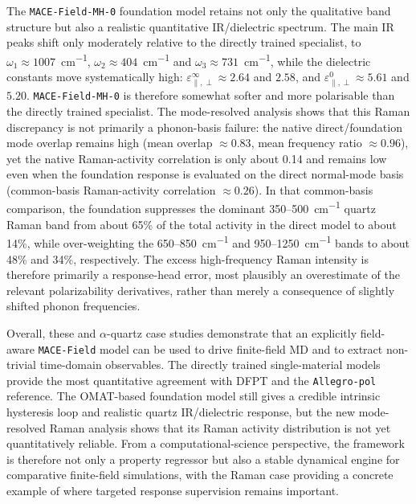 \documentclass[aps,physrev,graphicx,amsmath,amssymb,
               reprint,superscriptaddress]{revtex4-2}
\begin{document}
The \texttt{MACE-Field-MH-0} foundation model retains not only the qualitative band structure but also a realistic quantitative IR/dielectric spectrum. The main IR peaks shift only moderately relative to the directly trained specialist, to $\omega_1 \approx 1007$~\si{cm^{-1}}, $\omega_2 \approx 404$~\si{cm^{-1}} and $\omega_3 \approx 731$~\si{cm^{-1}}, while the dielectric constants move systematically high: $\varepsilon_{\parallel,\perp}^{\infty} \approx 2.64$ and $2.58$, and $\varepsilon_{\parallel,\perp}^{0} \approx 5.61$ and $5.20$. \texttt{MACE-Field-MH-0} is therefore somewhat softer and more polarisable than the directly trained specialist. The mode-resolved analysis shows that this Raman discrepancy is not primarily a phonon-basis failure: the native direct/foundation mode overlap remains high (mean overlap $\approx 0.83$, mean frequency ratio $\approx 0.96$), yet the native Raman-activity correlation is only about 0.14 and remains low even when the foundation response is evaluated on the direct normal-mode basis (common-basis Raman-activity correlation $\approx 0.26$). In that common-basis comparison, the foundation suppresses the dominant 350--500~\si{cm^{-1}} quartz Raman band from about 65\% of the total activity in the direct model to about 14\%, while over-weighting the 650--850~\si{cm^{-1}} and 950--1250~\si{cm^{-1}} bands to about 48\% and 34\%, respectively. The excess high-frequency Raman intensity is therefore primarily a response-head error, most plausibly an overestimate of the relevant polarizability derivatives, rather than merely a consequence of slightly shifted phonon frequencies.

Overall, these  and $\alpha$-quartz case studies demonstrate that an explicitly field-aware \texttt{MACE-Field} model can be used to drive finite-field MD and to extract non-trivial time-domain observables. The directly trained single-material models provide the most quantitative agreement with DFPT and the \texttt{Allegro-pol} reference. The OMAT-based foundation model still gives a credible intrinsic  hysteresis loop and realistic quartz IR/dielectric response, but the new mode-resolved Raman analysis shows that its Raman activity distribution is not yet quantitatively reliable. From a computational-science perspective, the framework is therefore not only a property regressor but also a stable dynamical engine for comparative finite-field simulations, with the Raman case providing a concrete example of where targeted response supervision remains important.
\end{document}
